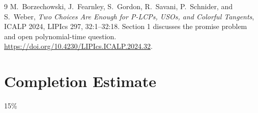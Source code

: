 \documentclass[11pt]{article}
\theoremstyle{definition}
\begin{document}
\begin{thebibliography}{9}
 M.~Borzechowski, J.~Fearnley, S.~Gordon, R.~Savani,
P.~Schnider, and S.~Weber, \emph{Two Choices Are Enough for P-LCPs, USOs,
and Colorful Tangents}, ICALP 2024, LIPIcs 297, 32:1--32:18.
Section 1 discusses the promise problem and open polynomial-time question.
\url{https://doi.org/10.4230/LIPIcs.ICALP.2024.32}.
\end{thebibliography}

\section{Completion Estimate}
15\%
\end{document}
